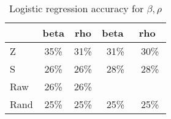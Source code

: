 \documentclass[10pt,twocolumn,letterpaper]{article}
\begin{document}
\begin{table}[]
\centering
\begin{small}
\begin{tabular}{l@{~}l@{~}l@{~}l@{~}l@{~}l}
\toprule
               & \multicolumn{2}{c}{\textbf{beta}} & \multicolumn{1}{c}{\textbf{rho}} & \multicolumn{1}{c}{\textbf{beta}\textbf{~\cite{disentanglement}}} & \multicolumn{1}{c}{\textbf{rho}\textbf{~\cite{disentanglement}}} \\ \midrule
Z              & \multicolumn{2}{c}{35\%}        & \multicolumn{1}{c}{31\%}                           & \multicolumn{1}{c}{31\%}                                 & \multicolumn{1}{c}{30\%}                               \\
S              & \multicolumn{2}{c}{26\%}        & \multicolumn{1}{c}{26\%}                           & \multicolumn{1}{c}{28\%}                                 & \multicolumn{1}{c}{28\%}                               \\
Raw & \multicolumn{2}{c}{26\%}        & \multicolumn{1}{c}{26\%}                           &                                        &                                       \\
Rand  & \multicolumn{2}{c}{25\%}        & \multicolumn{1}{c}{25\%}                           & \multicolumn{1}{c}{25\%}                                 & \multicolumn{1}{c}{25\%}                                \\ \bottomrule
\end{tabular}
\end{small}
\smallskip
\caption{Logistic regression accuracy for $\beta,\rho$}
\label{Tbl3_betarho}
\end{table}
\end{document}
